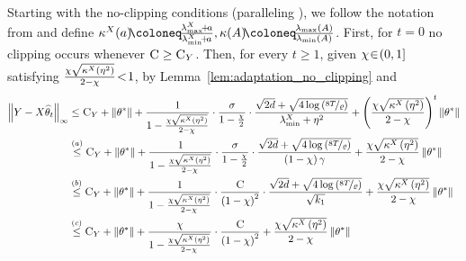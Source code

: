 \documentclass[11pt]{article}
\theoremstyle{definition}
\theoremstyle{plain}
\providecommand{\lemmaref}[1]{Lemma~\ref{#1}}
\newcommand{\Norm}[1]{\left\| #1 \right\|}
\providecommand{\norm}[1]{\Norm{#1}}
\begin{document}
Starting with the no-clipping conditions (paralleling \citet[Appendix .~C, Step.~2]{lev2026near}), we follow the notation from \citet[Appendix.~C]{lev2026near} and define $\kappa^{X}(a) \hspace{-0.2em}\coloneq\hspace{-0.2em} \frac{\lambda^{X}_{\max} \hspace{-0.15em}+\hspace{-0.15em} a}{\lambda^{X}_{\min} \hspace{-0.15em}+\hspace{-0.15em} a}, \kappa(A) \hspace{-0.2em}\coloneq\hspace{-0.2em} \frac{\lambda_{\max}(A)}{\lambda_{\min}(A)}$. First, for $t=0$ no clipping occurs whenever $\textsc{C} \geq \textsc{C}_Y$. Then, for every $t\geq 1$, given $\chi \hspace{-0.2em}\in\hspace{-0.2em} (0,1]$ satisfying $\frac{\chi\sqrt{\kappa^{X}\left(\eta^2\right)}}{2 - \chi} \hspace{-0.2em}<\hspace{-0.2em} 1$, by \lemmaref{lem:adaptation_no_clipping} and \citet[Appendix.~C, Step 2]{lev2026near}
\begin{align}
    \norm{Y - X\widehat{\theta}_t}_{\infty} &\leq \textsc{C}_Y + \norm{\theta^{*}} + \frac{1}{1 - \frac{\chi\sqrt{\kappa^{X}\left(\eta^2\right)}}{2-\chi}}\cdot\frac{\sigma}{1 - \frac{\chi}{2}}\cdot\frac{\sqrt{2d} + \sqrt{4\log\left(\nicefrac{8T}{\varrho}\right)}}{\lambda^{X}_{\min} + \eta^2} + \left(\frac{\chi\sqrt{\kappa^{X}\left(\eta^2\right)}}{2 - \chi}\right)^{t}\norm{\theta^{*}}\\
    &\overset{(a)}\leq \textsc{C}_Y + \norm{\theta^{*}} + \frac{1}{1 - \frac{\chi\sqrt{\kappa^{X}\left(\eta^2\right)}}{2-\chi}}\cdot\frac{\sigma}{1 - \frac{\chi}{2}}\cdot\frac{\sqrt{2d} + \sqrt{4\log\left(\nicefrac{8T}{\varrho}\right)}}{\left(1 - \chi\right)\gamma} + \frac{\chi\sqrt{\kappa^{X}\left(\eta^2\right)}}{2 - \chi}\norm{\theta^{*}}\\
    &\overset{(b)}\leq \textsc{C}_Y + \norm{\theta^{*}} + \frac{1}{1 - \frac{\chi\sqrt{\kappa^{X}\left(\eta^2\right)}}{2-\chi}}\cdot\frac{\textsc{C}}{\left(1 - \chi\right)^2}\cdot\frac{\sqrt{2d} + \sqrt{4\log\left(\nicefrac{8T}{\varrho}\right)}}{\sqrt{k_1}} + \frac{\chi\sqrt{\kappa^{X}\left(\eta^2\right)}}{2 - \chi}\norm{\theta^{*}}\\
    &\overset{(c)}\leq \textsc{C}_Y + \norm{\theta^{*}} + \frac{\chi}{1 - \frac{\chi\sqrt{\kappa^{X}\left(\eta^2\right)}}{2 - \chi}}\cdot\frac{\textsc{C}}{\left(1 - \chi\right)^2}
    + \frac{\chi\sqrt{\kappa^{X}\left(\eta^2\right)}}{2 - \chi}\norm{\theta^{*}}
\end{align}
\end{document}
